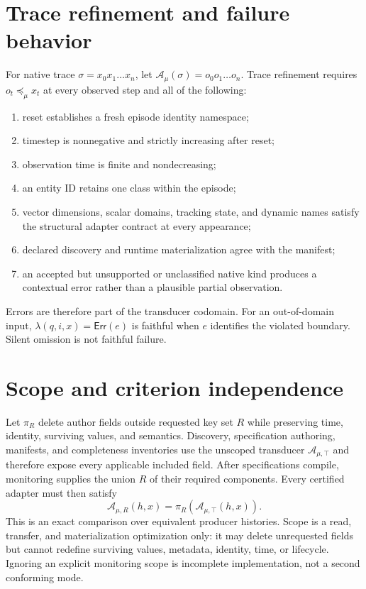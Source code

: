 \documentclass[11pt]{article}
\newcommand{\Err}{\mathsf{Err}}
\begin{document}
\section{Trace refinement and failure behavior}

For native trace $\sigma=x_0x_1\ldots x_n$, let
$\mathcal{A}_\mu(\sigma)=o_0o_1\ldots o_n$.  Trace refinement requires
$o_t\preceq_\mu x_t$ at every observed step and all of the following:

\begin{enumerate}
  \item reset establishes a fresh episode identity namespace;
  \item timestep is nonnegative and strictly increasing after reset;
  \item observation time is finite and nondecreasing;
  \item an entity ID retains one class within the episode;
  \item vector dimensions, scalar domains, tracking state, and dynamic names
        satisfy the structural adapter contract at every appearance;
  \item declared discovery and runtime materialization agree with the manifest;
  \item an accepted but unsupported or unclassified native kind produces a
        contextual error rather than a plausible partial observation.
\end{enumerate}

Errors are therefore part of the transducer codomain.  For an out-of-domain
input, $\lambda(q,i,x)=\Err(e)$ is faithful when $e$ identifies the violated
boundary.  Silent omission is not faithful failure.

\section{Scope and criterion independence}
\label{sec:scope}

Let $\pi_R$ delete author fields outside requested key set $R$ while
preserving time, identity, surviving values, and semantics.  Discovery,
specification authoring, manifests, and completeness inventories use the
unscoped transducer $\mathcal{A}_{\mu,\top}$ and therefore expose every
applicable included field.  After specifications compile, monitoring supplies
the union $R$ of their required components.  Every certified adapter must then
satisfy
\[
  \mathcal{A}_{\mu,R}(h,x)
  =\pi_R(\mathcal{A}_{\mu,\top}(h,x)).
\]
This is an exact comparison over equivalent producer histories.  Scope is a
read, transfer, and materialization optimization only: it may delete
unrequested fields but cannot redefine surviving values, metadata, identity,
time, or lifecycle.  Ignoring an explicit monitoring scope is incomplete
implementation, not a second conforming mode.
\end{document}
